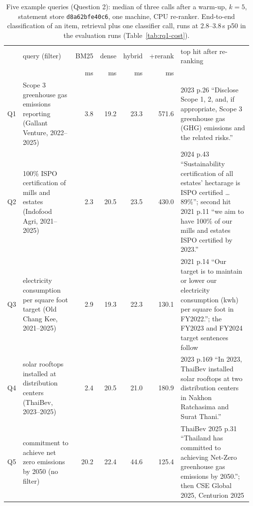 \documentclass[11pt]{article}
\begin{document}
\begin{table}[t]
\centering\small
\begin{tabular}{@{}lL{3.4cm}rrrrL{6.2cm}@{}}
\toprule
& query (filter) & BM25 & dense & hybrid & +rerank & top hit after re-ranking \\
& & ms & ms & ms & ms & \\
\midrule
Q1 & Scope 3 greenhouse gas emissions reporting (Gallant Venture, 2022--2025) & 3.8 & 19.2 & 23.3 & 571.6 & 2023 p.26 ``Disclose Scope 1, 2, and, if appropriate, Scope 3 greenhouse gas (GHG) emissions and the related risks.'' \\
Q2 & 100\% ISPO certification of mills and estates (Indofood Agri, 2021--2025) & 2.3 & 20.5 & 23.5 & 430.0 & 2024 p.43 ``Sustainability certification of all estates' hectarage is ISPO certified \ldots 89\%''; second hit 2021 p.11 ``we aim to have 100\% of our mills and estates ISPO certified by 2023.'' \\
Q3 & electricity consumption per square foot target (Old Chang Kee, 2021--2025) & 2.9 & 19.3 & 22.3 & 130.1 & 2021 p.14 ``Our target is to maintain or lower our electricity consumption (kwh) per square foot in FY2022.''; the FY2023 and FY2024 target sentences follow \\
Q4 & solar rooftops installed at distribution centers (ThaiBev, 2023--2025) & 2.4 & 20.5 & 21.0 & 180.9 & 2023 p.169 ``In 2023, ThaiBev installed solar rooftops at two distribution centers in Nakhon Ratchasima and Surat Thani.'' \\
Q5 & commitment to achieve net zero emissions by 2050 (no filter) & 20.2 & 22.4 & 44.6 & 125.4 & ThaiBev 2025 p.31 ``Thailand has committed to achieving Net-Zero greenhouse gas emissions by 2050.''; then CSE Global 2025, Centurion 2025 \\
\bottomrule
\end{tabular}
\caption{Five example queries (Question 2): median of three calls after a warm-up, $k = 5$, statement store \texttt{d8a62bfe40c6}, one machine, CPU re-ranker. End-to-end classification of an item, retrieval plus one classifier call, runs at 2.8--3.8\,s p50 in the evaluation runs (Table~\ref{tab:rq1-cost}).}
\label{tab:five-queries}
\end{table}
\end{document}
